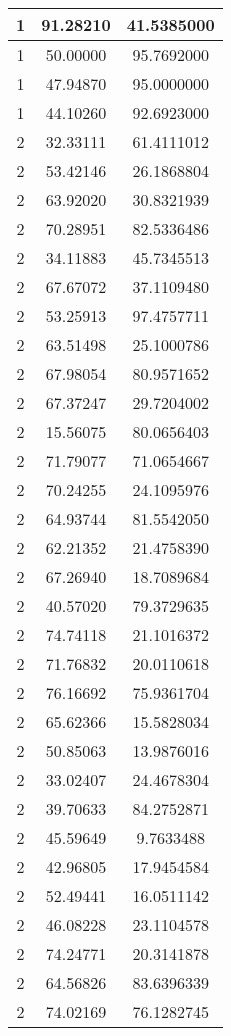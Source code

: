 \documentclass[
]{book}
\begin{document}
\begin{tabular}{c|c|c}
\hline
1 & 91.28210 & 41.5385000\\
\hline
1 & 50.00000 & 95.7692000\\
\hline
1 & 47.94870 & 95.0000000\\
\hline
1 & 44.10260 & 92.6923000\\
\hline
2 & 32.33111 & 61.4111012\\
\hline
2 & 53.42146 & 26.1868804\\
\hline
2 & 63.92020 & 30.8321939\\
\hline
2 & 70.28951 & 82.5336486\\
\hline
2 & 34.11883 & 45.7345513\\
\hline
2 & 67.67072 & 37.1109480\\
\hline
2 & 53.25913 & 97.4757711\\
\hline
2 & 63.51498 & 25.1000786\\
\hline
2 & 67.98054 & 80.9571652\\
\hline
2 & 67.37247 & 29.7204002\\
\hline
2 & 15.56075 & 80.0656403\\
\hline
2 & 71.79077 & 71.0654667\\
\hline
2 & 70.24255 & 24.1095976\\
\hline
2 & 64.93744 & 81.5542050\\
\hline
2 & 62.21352 & 21.4758390\\
\hline
2 & 67.26940 & 18.7089684\\
\hline
2 & 40.57020 & 79.3729635\\
\hline
2 & 74.74118 & 21.1016372\\
\hline
2 & 71.76832 & 20.0110618\\
\hline
2 & 76.16692 & 75.9361704\\
\hline
2 & 65.62366 & 15.5828034\\
\hline
2 & 50.85063 & 13.9876016\\
\hline
2 & 33.02407 & 24.4678304\\
\hline
2 & 39.70633 & 84.2752871\\
\hline
2 & 45.59649 & 9.7633488\\
\hline
2 & 42.96805 & 17.9454584\\
\hline
2 & 52.49441 & 16.0511142\\
\hline
2 & 46.08228 & 23.1104578\\
\hline
2 & 74.24771 & 20.3141878\\
\hline
2 & 64.56826 & 83.6396339\\
\hline
2 & 74.02169 & 76.1282745\\

\end{tabular}
\end{document}
